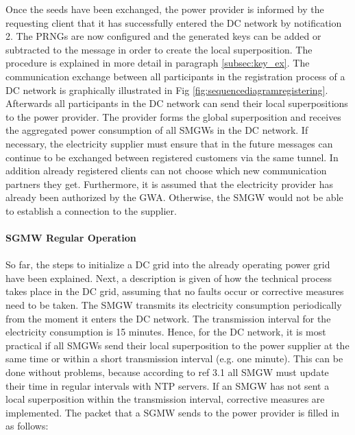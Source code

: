 Once the seeds have been exchanged, the power provider is informed by the requesting client that it has successfully entered the DC network by notification 2. The PRNGs are now configured and the generated keys can be added or subtracted to the message in order to create the local superposition. The procedure is explained in more detail in paragraph \ref{subsec:key_ex}.%
The communication exchange between all participants in the registration process of a DC network is graphically illustrated in Fig \ref{fig:sequencediagramregistering}. %
Afterwards all participants in the DC network can send their local superpositions to the power provider. The provider forms the global superposition and receives the aggregated power consumption of all SMGWs in the DC network. If necessary, the electricity supplier must ensure that in the future messages can continue to be exchanged between registered customers via the same tunnel. In addition already registered clients can not choose which new communication partners they get. Furthermore, it is assumed that the electricity provider has already been authorized by the GWA. Otherwise, the SMGW would not be able to establish a connection to the supplier.\\
\\
\textbf{SGMW Regular Operation}
\\
\\
So far, the steps to initialize a DC grid into the already operating power grid have been explained. Next, a description is given of how the technical process takes place in the DC grid, assuming that no faults occur or corrective measures need to be taken. The SMGW transmits its electricity consumption periodically from the moment it enters the DC network. The transmission interval for the electricity consumption is 15 minutes. Hence, for the DC network, it is most practical if all SMGWs send their local superposition to the power supplier at the same time or within a short transmission interval (e.g. one minute). This can be done without problems, because according to ref 3.1 all SMGW must update their time in regular intervals with NTP servers. If an SMGW has not sent a local superposition within the transmission interval, corrective measures are implemented. The packet that a SGMW sends to the power provider is filled in as follows:

